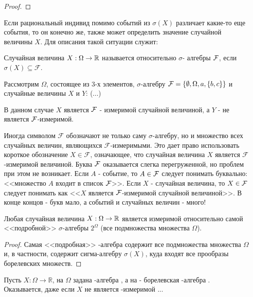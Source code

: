 {\begin{proof}
\end{proof}






Если рациональный индивид помимо событий из $ \sigma(X) $ различает какие-то еще события, то он конечно же, также может определить значение случайной величины $ X $. Для описания такой ситуации служит:

\begin{mydef} Случайная величина $X:\Omega\rightarrow\mathbb R$ называется  относительно $ \sigma $- алгебры $\mathcal{F}$, если $ \sigma(X)\subseteq \mathcal{F} $.
\end{mydef}

\begin{myex} Рассмотрим $\Omega$, состоящее из 3-х элементов, $\sigma$-алгебру $\mathcal{F}=\{\emptyset,\Omega,a,\{b,c\}\}$ и случайные величины $X$ и $Y$:
(...)

В данном случае $X$ является $\mathcal{F}$ - измеримой случайной величиной, а $Y$ - не является $\mathcal{F}$-измеримой.
\end{myex}


Иногда символом $\mathcal{F}$ обозначают не только саму $\sigma$-алгебру, но и множество всех случайных величин,
являющихся $\mathcal{F}$-измеримыми. Это дает право использовать короткое обозначение $X \in \mathcal{F}$, означающее, что
случайная величина $X$ является $\mathcal{F}$-измеримой величиной. Буква $\mathcal{F}$ оказывается слегка перегруженной, но проблем при этом не возникает. Если $A$ - событие, то $A\in \mathcal{F}$ следует понимать буквально: <<множество $A$ входит в список $\mathcal{F}$>>. Если $X$ - случайная величина, то $X\in \mathcal{F}$ следует понимать как <<$X$ является $\mathcal{F}$-измеримой случайной величиной>>. В конце концов - букв мало, а событий и случайных величин - много!

\begin{myth} Любая случайная величина $X:\Omega\rightarrow \mathbb R$ является измеримой относительно самой <<подробной>> $\sigma$-алгебры $2^\Omega$ (все подмножества множества $\Omega$).
\end{myth}

\begin{proof} Самая <<подробная>> \s-алгебра содержит все подмножества множества $\Omega$ и, в частности, содержит сигма-алгебру $ \sigma(X) $, куда входят все прообразы борелевских множеств.
\end{proof}

Пусть $X:\Omega\to\mathbb{R}$, на $\Omega$ задана \s-алгебра \F, а на \R - борелевская \s-алгебра \B. Оказывается, даже если $X$ не является \F-измеримой ...


}
